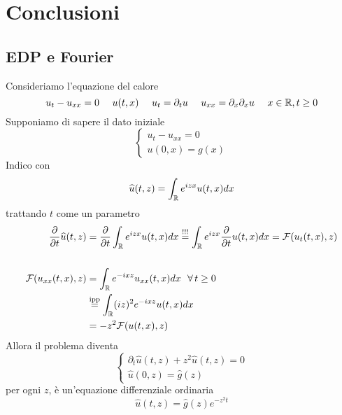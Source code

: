 \chapter{Conclusioni}

\section{EDP e Fourier}

Consideriamo l'equazione del calore
\begin{equation*}
u_{t} - u_{xx} = 0\ \ \ \ u(t, x) \ \ \ \ u_{t} = \partial_{t} u\ \ \ \ u_{xx} = \partial_{x} \partial_{x} u\ \ \ \ x\in \mathbb{R}, t \geq 0
\end{equation*}
Supponiamo di sapere il dato iniziale
\begin{equation*}
\begin{cases}
u_{t} - u_{xx} = 0\\
u(0, x) = g(x)
\end{cases}
\end{equation*}
Indico con
\begin{equation*}
\widehat{u}(t, z) = \int_{\mathbb{R}} e^{izx} u(t, x) dx
\end{equation*}
trattando $t$ come un parametro
\begin{equation*}
\begin{aligned}
\frac{\partial}{\partial t}\hat{u}(t, z) & = \frac{\partial}{\partial t}\int_{\RR} e^{izx} u(t, x) dx\overset{!!!}{=}\int_{\RR} e^{izx}\frac{\partial}{\partial t} u(t, x) dx = \Fc(u_{t}(t, x), z)\\
 & \\
\Fc(u_{xx}(t, x), z) & = \int_{\RR} e^{- ixz} u_{xx}(t, x) dx\ \ \forall t \geq 0\\
 & \overset{\text{ipp}}{=}\int_{\RR}(iz)^{2} e^{- ixz} u(t, x) dx\\
 & = - z^{2}\Fc(u(t, x), z)
\end{aligned}
\end{equation*}
Allora il problema diventa
\begin{equation*}
\begin{cases}
\partial_{t}\hat{u}(t, z) + z^{2}\hat{u}(t, z) = 0\\
\hat{u}(0, z) = \hat{g}(z)
\end{cases}
\end{equation*}
per ogni $z$, è un'equazione differenziale ordinaria
\begin{equation*}
\hat{u}(t, z) = \hat{g}(z) e^{- z^{2} t}
\end{equation*}
